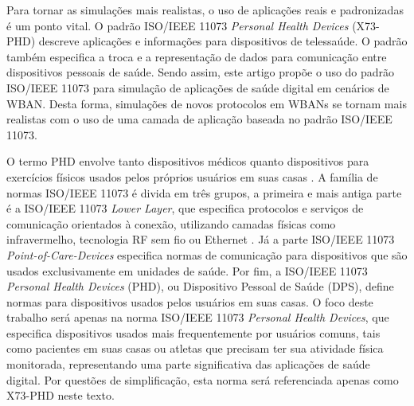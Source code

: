 Para tornar as simulações mais realistas, o uso de aplicações reais e padronizadas é um ponto vital. O padrão ISO/IEEE 11073 \textit{Personal Health Devices} (X73-PHD) descreve aplicações e informações para dispositivos de telessaúde. O padrão também especifica a troca e a representação de dados para comunicação entre dispositivos pessoais de saúde. Sendo assim, este artigo propõe o uso do padrão ISO/IEEE 11073 para simulação de aplicações de saúde digital em cenários de WBAN. Desta forma, simulações de novos protocolos em WBANs se tornam mais realistas com o uso de uma camada de aplicação baseada no padrão ISO/IEEE 11073.

O termo PHD envolve tanto dispositivos médicos quanto dispositivos para exercícios físicos usados pelos próprios usuários em suas casas \cite{b3}. A família de normas ISO/IEEE 11073 é divida em três grupos, a primeira e mais antiga parte é a ISO/IEEE 11073 \textit{Lower Layer}, que especifica protocolos e serviços de comunicação orientados à conexão, utilizando camadas físicas como infravermelho, tecnologia RF sem fio ou Ethernet \cite{b16}. Já a parte ISO/IEEE 11073 \textit{Point-of-Care-Devices} especifica normas de comunicação para dispositivos que são usados exclusivamente em unidades de saúde. Por fim, a ISO/IEEE 11073 \textit{Personal Health Devices} (PHD), ou Dispositivo Pessoal de Saúde (DPS), define normas para dispositivos usados pelos usuários em suas casas. O foco deste trabalho será apenas na norma ISO/IEEE 11073 \textit{Personal Health Devices}, que especifica dispositivos usados mais frequentemente por usuários comuns, tais como pacientes em suas casas ou atletas que precisam ter sua atividade física monitorada, representando uma parte significativa das aplicações de saúde digital. Por questões de simplificação, esta norma será referenciada apenas como X73-PHD neste texto.

